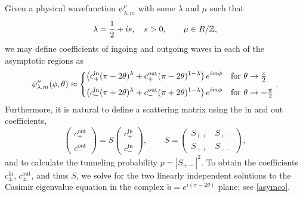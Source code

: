 \documentclass[11pt]{article}
\newcommand{\be}{\begin{equation}}
\newcommand{\ee}{\end{equation}}
\newcommand{\ZZ}{\mathbb{Z}}
\newcommand{\RR}{\mathbb{R}}
\newcommand{\IN}{\text{in}}
\newcommand{\OUT}{\text{out}}
\newcommand{\tht}{\theta}
\newcommand{\lam}{\lambda}
\newcommand{\ov}{\over}
\def\RR{R}
\begin{document}
Given a physical wavefunction $\psi_{\lam, m}^{\nu}$ with some $\lam$ and $\mu$ such that
\be
\lam={1 \ov 2}+i s,\quad s>0, \qquad \mu\in \RR/\ZZ,
\ee
we may define coefficients of ingoing and outgoing waves in each of the asymptotic regions as
\be \label{asymc}
\psi_{\lam,m}^{\nu}(\phi,\theta)\approx\begin{dcases}
\left(c_{+}^{\IN}(\pi-2\theta)^{\lambda}
+c_{+}^{\OUT}(\pi-2\theta)^{1-\lambda}\right)e^{im\phi}
&\text{for }\theta\to\tfrac{\pi}{2}\\[3pt]
\left(c_{-}^{\IN}(\pi+2\theta)^{\lambda}
+c_{-}^{\OUT}(\pi+2\theta)^{1-\lambda}\right)e^{im\phi}
&\text{for }\theta\to-\tfrac{\pi}{2}
\end{dcases}.
\ee
Furthermore, it is natural to define a scattering matrix using the in and out coefficients,  
\be
\begin{pmatrix} 
c^{\OUT}_+ \\
c^{\OUT}_- 
\end{pmatrix} = S \begin{pmatrix}c^{\IN}_+ \\
c^{\IN}_-
\end{pmatrix}, \qquad S=\begin{pmatrix} S_{++} & S_{+-} \\
S_{-+} & S_{--}
 \end{pmatrix},
 \ee
and to calculate the tunneling probability $p=|S_{+-}|^2$. To obtain the coefficients $c_{\pm}^{\text{in}}$, $c_{\pm}^{\text{out}}$, and thus $S$, we solve for the two linearly independent solutions to the Casimir eigenvalue equation in the complex $\tilde{u}=e^{i(\pi-2 \tht)}$ plane; see \eqref{asymco}. 
\end{document}
